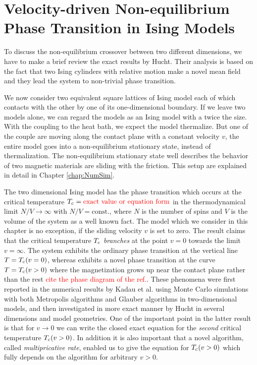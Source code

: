 
\chapter{Velocity-driven Non-equilibrium Phase Transition in Ising Models}\label{ch:review}

To discuss the non-equilibrium crossover between two different dimensions, we have to make a brief review the exact results\cite{Hucht2009b} by Hucht. Their analysis is based on the fact that two Ising cylinders with relative motion make a novel mean field and they lead the system to non-trivial phase transition.

We now consider two equivalent square lattices of Ising model each of which contacts with the other by one of its one-dimensional boundary. If we leave two models alone, we can regard the models as an Ising model with a twice the size. With the coupling to the heat bath, we expect the model thermalize. But one of the couple are moving along the contact plane with a constant velocity $v$, the entire model goes into a non-equilibrium stationary state, instead of thermalization. The non-equilibrium stationary state well describes the behavior of two magnetic materials are sliding with the friction. This setup are explained in detail in Chapter \ref{chap:NumSim}.

The two dimensional Ising model has the phase transition which occurs at the critical temperature $T_{\rm c}=\text{\textcolor{red}{exact value or equation form}}$ in the thermodynamical limit $N/V\to\infty$ with $N/V=\text{const.}$, where $N$ is the number of spins and $V$ is the volume of the system as a well known fact. The model which we consider in this chapter is no exception, if the sliding velocity $v$ is set to zero. The result\cite{Hucht2009b} claims that the critical temperature $T_{\rm c}$ \textit{branches} at the point $v=0$ towards the limit $v=\infty$. The system exhibits the ordinary phase transition at the vertical line $T=T_{\rm c}(v=0)$, whereas exhibits a novel phase transition at the curve $T=T_{\rm c}(v>0)$ where the magnetization grows up near the contact plane rather than the rest \textcolor{red}{cite the phase diagram of the ref.}. These phenomena were first reported in the numerical results\cite{Kadau2008} by Kadau et al. using Monte Carlo simulations with both Metropolis algorithms and Glauber algorithms in two-dimensional models, and then investigated in more exact manner\cite{Hucht2009b} by Hucht in several dimensions and model geometries. One of the important point in the latter result is that for $v\to 0$ we can write the closed exact equation for the \textit{second} critical temperature $T_{\rm c}(v>0)$. In addition it is also important that a novel algorithm, called \textit{multipricative rate}, enabled us to give the equation for $T_{\rm c}(v>0)$ which fully depends on the algorithm for arbitrary $v>0$.

